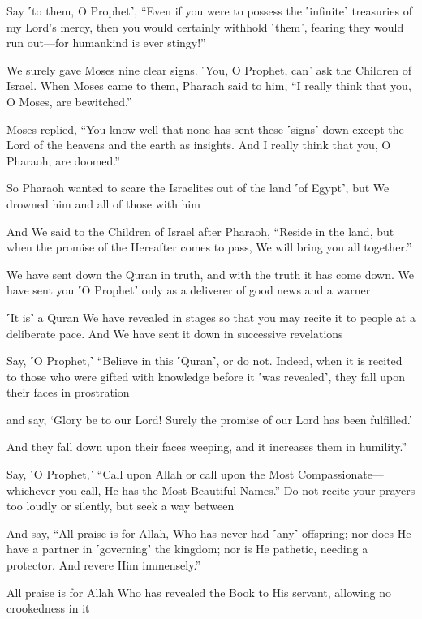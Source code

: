 Say ˹to them, O Prophet˺, “Even if you were to possess the ˹infinite˺ treasuries of my Lord’s mercy, then you would certainly withhold ˹them˺, fearing they would run out—for humankind is ever stingy!”

We surely gave Moses nine clear signs. ˹You, O Prophet, can˺ ask the Children of Israel. When Moses came to them, Pharaoh said to him, “I really think that you, O Moses, are bewitched.”

Moses replied, “You know well that none has sent these ˹signs˺ down except the Lord of the heavens and the earth as insights. And I really think that you, O Pharaoh, are doomed.”

So Pharaoh wanted to scare the Israelites out of the land ˹of Egypt˺, but We drowned him and all of those with him

And We said to the Children of Israel after Pharaoh, “Reside in the land, but when the promise of the Hereafter comes to pass, We will bring you all together.”

We have sent down the Quran in truth, and with the truth it has come down. We have sent you ˹O Prophet˺ only as a deliverer of good news and a warner

˹It is˺ a Quran We have revealed in stages so that you may recite it to people at a deliberate pace. And We have sent it down in successive revelations

Say, ˹O Prophet,˺ “Believe in this ˹Quran˺, or do not. Indeed, when it is recited to those who were gifted with knowledge before it ˹was revealed˺, they fall upon their faces in prostration

and say, ‘Glory be to our Lord! Surely the promise of our Lord has been fulfilled.’

And they fall down upon their faces weeping, and it increases them in humility.”

Say, ˹O Prophet,˺ “Call upon Allah or call upon the Most Compassionate—whichever you call, He has the Most Beautiful Names.” Do not recite your prayers too loudly or silently, but seek a way between

And say, “All praise is for Allah, Who has never had ˹any˺ offspring; nor does He have a partner in ˹governing˺ the kingdom; nor is He pathetic, needing a protector. And revere Him immensely.”

All praise is for Allah Who has revealed the Book to His servant, allowing no crookedness in it

